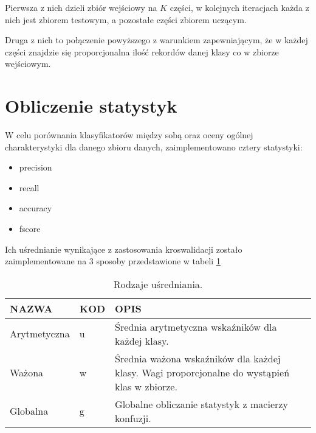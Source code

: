 Pierwsza z nich dzieli zbiór wejściowy na $K$ części, w kolejnych iteracjach każda z nich jest zbiorem testowym, a pozostałe części zbiorem uczącym.

Druga z nich to połączenie powyższego z warunkiem zapewniającym, że w każdej części znajdzie się proporcjonalna ilość rekordów danej klasy co w zbiorze wejściowym.
	\section{Obliczenie statystyk}
W celu porównania klasyfikatorów między sobą oraz oceny ogólnej charakterystyki dla danego zbioru danych, zaimplementowano cztery statystyki:
\begin{itemize}
\item precision
\item recall
\item accuracy
\item fscore
\end{itemize}

Ich uśrednianie wynikające z zastosowania kroswalidacji zostało zaimplementowane na 3 sposoby przedstawione w tabeli \ref{avg-stats}

\begin{table}[H]
\centering
\caption{Rodzaje uśredniania.}
\label{avg-stats}
\begin{tabular}{  ll m{10cm}}
NAZWA & KOD & OPIS\\\hline
Arytmetyczna & u & Średnia arytmetyczna wskaźników dla każdej klasy.\\\hline
Ważona & w & Średnia ważona wskaźników dla każdej klasy. Wagi proporcjonalne do wystąpień klas w zbiorze. \\\hline
Globalna & g & Globalne obliczanie statystyk z macierzy konfuzji.\\\hline
\end{tabular}
\end{table}